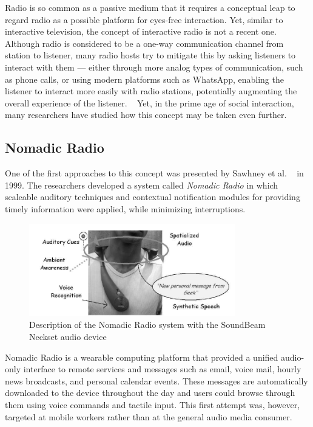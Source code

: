 Radio is so common as a passive medium that it requires a conceptual leap to regard radio as a possible platform for eyes-free interaction. Yet, similar to interactive television, the concept of interactive radio is not a recent one. Although radio is considered to be a one-way communication channel from station to listener, many radio hosts try to mitigate this by asking listeners to interact with them — either through more analog types of communication, such as phone calls, or using modern platforms such as WhatsApp, enabling the listener to interact more easily with radio stations, potentially augmenting the overall experience of the listener. ~\cite{Claes2018, Ren2004} Yet, in the prime age of social interaction, many researchers have studied how this concept may be taken even further.

\subsection{Nomadic Radio}

One of the first approaches to this concept was presented by Sawhney et al. ~\cite{Sawhney1999} in 1999. The researchers developed a system called \textit{Nomadic Radio} in which scaleable auditory techniques and contextual notification modules for providing timely information were applied, while minimizing interruptions.

\begin{figure}[h]
\centering
\includegraphics[width=0.8\textwidth]{./Images/nomadicradio.png}
\caption{Description of the Nomadic Radio system with the SoundBeam Neckset audio device}
\label{fig:test_env}
\end{figure}

Nomadic Radio is a wearable computing platform that provided a unified audio-only interface to remote services and messages such as email, voice mail, hourly news broadcasts, and personal calendar events. These messages are automatically downloaded to the device throughout the day and users could browse through them using voice commands and tactile input. This first attempt was, however, targeted at mobile workers rather than at the general audio media consumer.

